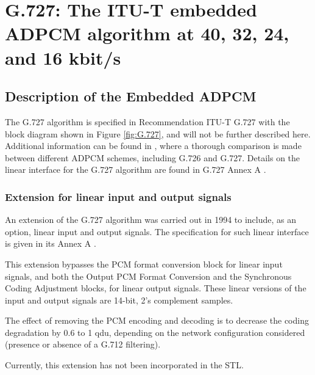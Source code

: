 \chapter{G.727: The ITU-T embedded ADPCM algorithm at
         40, 32, 24, and 16 kbit/s}



\section{Description of the Embedded ADPCM}

The G.727 algorithm is specified in Recommendation ITU-T G.727 \cite{G.727} with the block diagram shown in Figure \ref{fig:G.727}, and will not be further described here.
Additional information can be found in \cite{ADPCM-Tech-Report}, where a thorough comparison is made between different ADPCM schemes, including G.726 and G.727.
Details on the linear interface for the G.727 algorithm are found in G.727 Annex A \cite{G.727:LinearIO}.


\subsection{Extension for linear input and output signals}

An extension of the G.727 algorithm was carried out in 1994 to include, as
an option, linear input and output signals. The specification for such linear
interface is given in its Annex A \cite{G.727:LinearIO}.

This extension bypasses the PCM format conversion block for linear input
signals, and both the Output PCM Format Conversion and the Synchronous
Coding Adjustment blocks, for linear output signals. These linear versions
of the input and output signals are 14-bit, 2's complement samples.

The effect of removing the PCM encoding and decoding is to decrease the
coding degradation by 0.6 to 1 qdu, depending on the network configuration
considered (presence or absence of a G.712 filtering).

Currently, this extension has not been incorporated in the STL.

